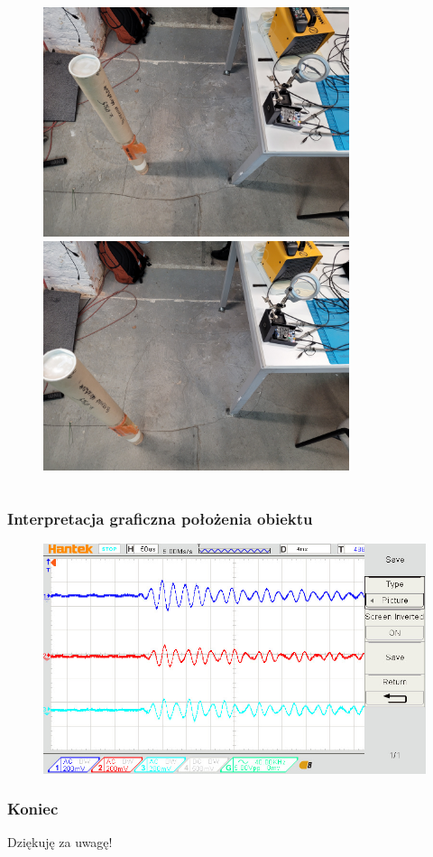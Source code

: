\documentclass[xcolor=dvipsnames]{beamer}%
\begin{document}
\begin{frame}
\begin{columns}
		\begin{column}{0.49\textwidth}
			\begin{figure}
				\includegraphics[width=0.8\textwidth]{figure/20230124_225325.jpg}
				\includegraphics[width=0.8\textwidth]{figure/20230124_225339.jpg}
			\end{figure}		
		\end{column}
	\end{columns}
\end{frame}
	
\begin{frame}
	\frametitle{Interpretacja graficzna położenia obiektu}
	\begin{figure}
		\includegraphics[width=\textwidth]{figure/dso_01_25_07_00_00.jpg}
	\end{figure}
\end{frame}

\begin{frame}
	\frametitle{Koniec}
	\centering
	Dziękuję za uwagę!
\end{frame}
\end{document}
